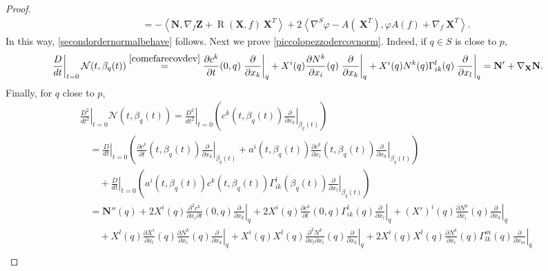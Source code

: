 \documentclass[11pt]{amsart}
\newcommand{\n}[1]{\nabla^\varepsilon_{ #1 }}
\newcommand{\N}{\mathcal N}
\newcommand{\X}{\mathbf{X}}
\newcommand{\Z}{\mathbf{Z}}
\renewcommand{\n}{\mathbf{N}}
\DeclareMathOperator{\R}{R}
\theoremstyle{definition}
\theoremstyle{remark}
\numberwithin{equation}{section}
\begin{document}
\begin{proof}
\begin{equation*}
\begin{split}
         &=-\left \langle \n,\nabla_{f}\Z+\R(\X,f)\ \X^T\right\rangle+2\left\langle \nabla^S\varphi- A\left(\ \X^T\right) ,\varphi A(f)+\nabla_f\ \X^T\right\rangle.
    \end{split}
\end{equation*}
In this way, \eqref{secondordernormalbehave} follows. Next we prove \eqref{piccolopezzodercovnorm}. Indeed, if $q\in S$ is close to $p$,
    \begin{equation*}
    \begin{split}
          \left.\frac{D}{dt}\right|_{t=0}\N(t,\beta_q(t))&\overset{\eqref{comefarecovdev}}{=}\frac{\partial c^k}{\partial t}(0,q)\left.\frac{\partial}{\partial x_k}\right|_q+X^i(q)\frac{\partial N^k}{\partial x_i}(q)\left.\frac{\partial}{\partial x_k}\right|_q+X^i(q)N^k(q)\Gamma_{ik}^l(q)\left.\frac{\partial}{\partial x_l}\right|_q=\n'+\nabla_\X \n.
    \end{split}
    \end{equation*}
 Finally, for $q$ close to $p$,
\begin{equation*}
\begin{split}
    & \left.\frac{D^2}{dt^2}\right|_{t=0}\mathcal N(t,\beta_q(t))=\left.\frac{D^2}{dt^2}\right|_{t=0}\left(c^k(t,\beta_q(t))\left.\frac{\partial}{\partial x_k}\right|_{\beta_q(t)}\right)\\
    &\quad=\left.\frac{D}{dt}\right|_{t=0}\left(\frac{\partial c^k}{\partial t}(t,\beta_q(t))\left.\frac{\partial}{\partial x_k}\right|_{\beta_q(t)}+a^i(t,\beta_q(t))\frac{\partial c^k}{\partial x_i}(t,\beta_q(t))\left.\frac{\partial}{\partial x_k}\right|_{\beta_q(t)}\right)\\
    &\qquad+\left.\frac{D}{dt}\right|_{t=0}\left(a^i(t,\beta_q(t))c^k(t,\beta_q(t))\Gamma_{ik}^l(\beta_q(t))\left.\frac{\partial}{\partial x_l}\right|_{\beta_q(t)}\right)\\
    &\quad=\n''(q)+2X^i(q)\frac{\partial^2 c^k}{\partial x_i\partial t}(0,q)\left.\frac{\partial}{\partial x_k}\right|_{q}+2X^i(q)\frac{\partial c^k}{\partial t}(0,q)\Gamma_{ik}^l(q)\left.\frac{\partial}{\partial x_l}\right|_{q}+(X')^i(q)\frac{\partial N^k}{\partial x_i}(q)\left.\frac{\partial}{\partial x_k}\right|_{q}\\
    &\qquad+X^l(q)\frac{\partial X^i}{\partial x_l}(q)\frac{\partial N^k}{\partial x_i}(q)\left.\frac{\partial}{\partial x_k}\right|_{q}+X^i(q)X^l(q)\frac{\partial ^2N^k}{\partial x_l\partial x_i}(q)\left.\frac{\partial}{\partial x_k}\right|_{q}+2X^i(q)X^l(q)\frac{\partial N^k}{\partial x_i}(q)\Gamma_{lk}^m(q)\left.\frac{\partial}{\partial x_m}\right|_{q}\\

\end{split}
\end{equation*}
\end{proof}
\end{document}

